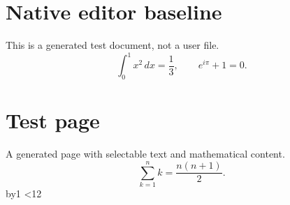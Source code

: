 \documentclass{article}
\begin{document}
\section{Native editor baseline}
This is a generated test document, not a user file.
\[
\int_0^1 x^2\,dx=\frac13,\qquad e^{i\pi}+1=0.
\]
\newcount\p
{}
\loop
\newpage
\section{Test page \the\p}
A generated page with selectable text and mathematical content.
\[
\sum_{k=1}^n k=\frac{n(n+1)}2.
\]
\advance\p by1
\ifnum\p<12\repeat
\end{document}
